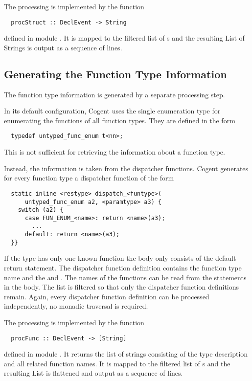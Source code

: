 The processing is implemented by the function
\begin{verbatim}
  procStruct :: DeclEvent -> String
\end{verbatim}
defined in module . It is mapped to the filtered list of s and the resulting
List of Strings is output as a sequence of lines.

\subsection{Generating the Function Type Information}
\label{impl-ctypinfo-func}

The function type information is generated by a separate processing step. 

In its default configuration, Cogent uses the single enumeration type  for enumerating
the functions of all function types. They are defined in the form
\begin{verbatim}
  typedef untyped_func_enum t<nn>;
\end{verbatim}
This is not sufficient for retrieving the information about a function type.

Instead, the information is taken from the dispatcher functions. Cogent generates for every function type a dispatcher 
function of the form
\begin{verbatim}
  static inline <restype> dispatch_<funtype>(
      untyped_func_enum a2, <paramtype> a3) { 
    switch (a2) {
      case FUN_ENUM_<name>: return <name>(a3);
        ...
      default: return <name>(a3);
  }}
\end{verbatim}
If the type has only one known function the body only consists of the default return statement.
The dispatcher function definition contains the function type name  and the  and .
The names of the functions can be read from the  statements in the body. The  list is filtered
so that only the dispatcher function definitions remain. Again, every dispatcher function definition
can be processed independently, no monadic traversal is required.

The processing is implemented by the function
\begin{verbatim}
  procFunc :: DeclEvent -> [String]
\end{verbatim}
defined in module . It returns the list of strings consisting of the type description and all related 
function names. It is mapped to the filtered list of s and the resulting
List is flattened and output as a sequence of lines.

